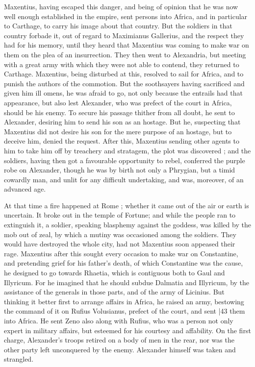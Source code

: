 Maxentius, having escaped this danger, and being of opinion that he was now well enough established in the empire, sent persons into Africa, and in particular to Carthage, to carry his image about that country. But the soldiers in that country forbade it, out of regard to Maximianus Gallerius, and the respect they had for his memory, until they heard that Maxentius was coming to make war on them on the plea of an insurrection. They then went to Alexandria, but meeting with a great army with which they were not able to contend, they returned to Carthage. Maxentius, being disturbed at this, resolved to sail for Africa, and to punish the authors of the commotion. But the soothsayers having sacrificed and given him ill omens, he was afraid to go, not only because the entrails had that appearance, but also lest Alexander, who was prefect of the court in Africa, should be his enemy. To secure his passage thither from all doubt, he sent to Alexander, desiring him to send his son as an hostage. But he, suspecting that Maxentius did not desire his son for the mere purpose of an hostage, but to deceive him, denied the request. After this, Maxentius sending other agents to him to take him off by treachery and stratagem, the plot was discovered ; and the soldiers, having then got a favourable opportunity to rebel, conferred the purple robe on Alexander, though he was by birth not only a Phrygian, but a timid cowardly man, and unlit for any difficult undertaking, and was, moreover, of an advanced age.

At that time a fire happened at Rome ; whether it came out of the air or earth is uncertain. It broke out in the temple of Fortune; and while the people ran to extinguish it, a soldier, speaking blasphemy against the goddess, was killed by the mob out of zeal, by which a mutiny was occasioned among the soldiers. They would have destroyed the whole city, had not Maxentius soon appeased their rage. Maxentius after this sought every occasion to make war on Constantine, and pretending grief for his father's death, of which Constantine was the cause, he designed to go towards Rhaetia, which is contiguous both to Gaul and Illyricum. For he imagined that he should subdue Dalmatia and Illyricum, by the assistance of the generals in those parts, and of the army of Licinius. But thinking it better first to arrange affairs in Africa, he raised an army, bestowing the command of it on Rufius Volusianus, prefect of the court, and sent
|43 them into Africa. He sent Zeno also along with Rufius, who was a person not only expert in military affairs, but esteemed for his courtesy and affability. On the first charge, Alexander's troops retired on a body of men in the rear, nor was the other party left unconquered by the enemy. Alexander himself was taken and strangled.

